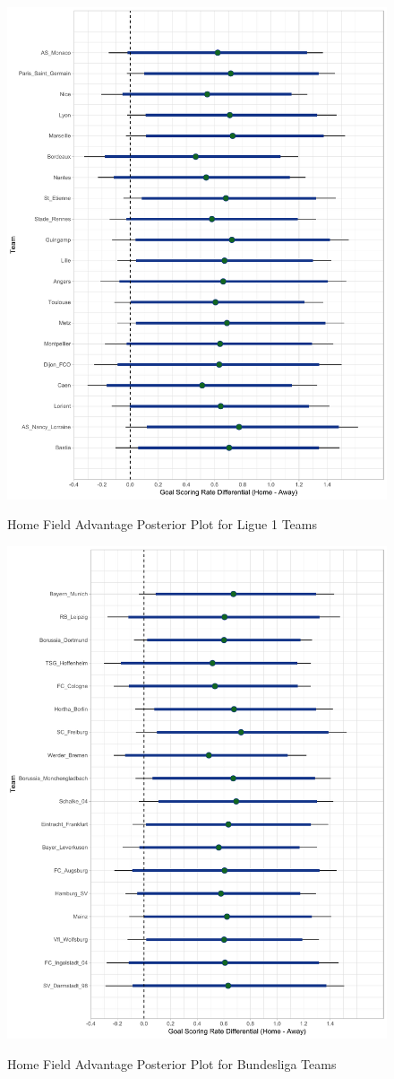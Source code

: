 \documentclass[USenglish]{article}
\begin{document}
\begin{figure}
\caption{Home Field Advantage Posterior Plot for Ligue 1 Teams}
{\includegraphics[width=0.90\linewidth]{HFA_Ligue111.pdf}}
\label{fig5}
\end{figure}

\begin{figure}
\caption{Home Field Advantage Posterior Plot for Bundesliga Teams}
{\includegraphics[width=0.90\linewidth]{HFA_Bundesliga11.pdf}}
\label{fig6}
\end{figure}
\end{document}

